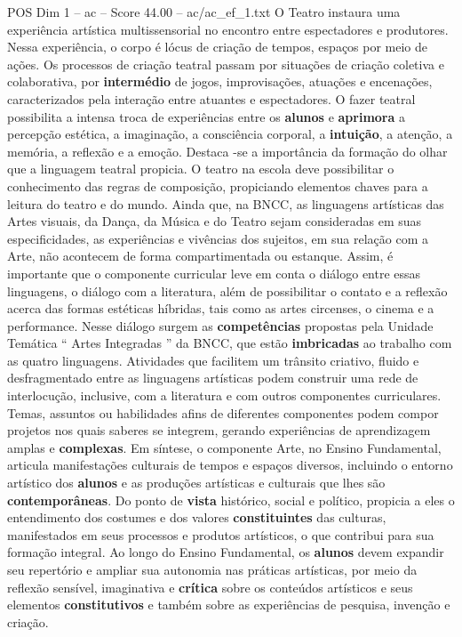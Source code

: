\begin{textsample}{POS Dim 1 – ac – Score 44.00 – ac/ac\_ef\_1.txt}
O Teatro instaura uma experiência artística multissensorial no encontro entre espectadores e produtores.
Nessa experiência, o corpo é lócus de criação de tempos, espaços por meio de ações.
Os processos de criação teatral passam por situações de criação coletiva e colaborativa, por \textbf{intermédio} de jogos, improvisações, atuações e encenações, caracterizados pela interação entre atuantes e espectadores.
O fazer teatral possibilita a intensa troca de experiências entre os \textbf{alunos} e \textbf{aprimora} a percepção estética, a imaginação, a consciência corporal, a \textbf{intuição}, a atenção, a memória, a reflexão e a emoção.
Destaca -se a importância da formação do olhar que a linguagem teatral propicia.
O teatro na escola deve possibilitar o conhecimento das regras de composição, propiciando elementos chaves para a leitura do teatro e do mundo.
Ainda que, na BNCC, as linguagens artísticas das Artes visuais, da Dança, da Música e do Teatro sejam consideradas em suas especificidades, as experiências e vivências dos sujeitos, em sua relação com a Arte, não acontecem de forma compartimentada ou estanque.
Assim, é importante que o componente curricular leve em conta o diálogo entre essas linguagens, o diálogo com a literatura, além de possibilitar o contato e a reflexão acerca das formas estéticas híbridas, tais como as artes circenses, o cinema e a performance.
Nesse diálogo surgem as \textbf{competências} propostas pela Unidade Temática “ Artes Integradas ” da BNCC, que estão \textbf{imbricadas} ao trabalho com as quatro linguagens.
Atividades que facilitem um trânsito criativo, fluido e desfragmentado entre as linguagens artísticas podem construir uma rede de interlocução, inclusive, com a literatura e com outros componentes curriculares.
Temas, assuntos ou habilidades afins de diferentes componentes podem compor projetos nos quais saberes se integrem, gerando experiências de aprendizagem amplas e \textbf{complexas}.
Em síntese, o componente Arte, no Ensino Fundamental, articula manifestações culturais de tempos e espaços diversos, incluindo o entorno artístico dos \textbf{alunos} e as produções artísticas e culturais que lhes são \textbf{contemporâneas}.
Do ponto de \textbf{vista} histórico, social e político, propicia a eles o entendimento dos costumes e dos valores \textbf{constituintes} das culturas, manifestados em seus processos e produtos artísticos, o que contribui para sua formação integral.
Ao longo do Ensino Fundamental, os \textbf{alunos} devem expandir seu repertório e ampliar sua autonomia nas práticas artísticas, por meio da reflexão sensível, imaginativa e \textbf{crítica} sobre os conteúdos artísticos e seus elementos \textbf{constitutivos} e também sobre as experiências de pesquisa, invenção e criação.

\end{textsample}
